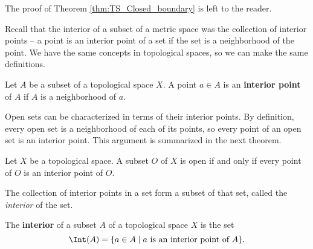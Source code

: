 The proof of Theorem \ref{thm:TS_Closed_boundary} is left to the reader.


\label{sec_interior_set}

Recall that the interior of a subset of a metric space was the collection of interior points -- a point is an interior point of a set if the set is a neighborhood of the point. We have the same concepts in topological spaces, so we can make the same definitions. 



\begin{definition} Let $A$ be a subset of a topological space $X$. A point $a \in A$ is an \textbf{interior point} of $A$ if $A$ is a neighborhood of $a$.
\end{definition}



Open sets can be characterized in terms of their interior points. By definition, every open set is a neighborhood of each of its points, so every point of an open set is an interior point. This argument is summarized in the next theorem. 



\begin{theorem} Let $X$ be a topological space. A subset $O$ of $X$ is open if and only if every point of $O$ is an interior point of $O$. 
\end{theorem}



The collection of interior points in a set form a subset of that set, called the \emph{interior} of the set.



\begin{definition} The \textbf{interior} of a subset $A$ of a topological space $X$ is the set
\[\Int(A) = \{a \in A \mid a \text{ is an interior point of } A\}.\]
\end{definition}



